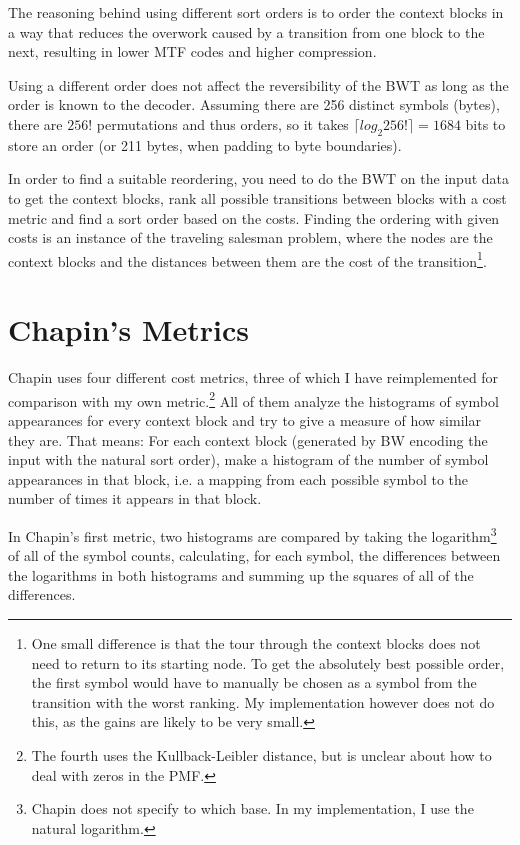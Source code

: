 \documentclass[a4paper]{scrreprt}
\begin{document}
The reasoning behind using different sort orders is to order the context blocks
in a way that reduces the overwork caused by a transition from one block to the
next, resulting in lower MTF codes and higher compression.

Using a different order does not affect the reversibility of the BWT as long as
the order is known to the decoder. Assuming there are 256 distinct symbols
(bytes), there are \(256!\) permutations and thus orders, so it takes \(\lceil
log_{2}256! \rceil = 1684\) bits to store an order (or 211 bytes, when
padding to byte boundaries).

In order to find a suitable reordering, you need to do the BWT on the input data
to get the context blocks, rank all possible transitions between blocks with a
cost metric and find a sort order based on the costs. Finding the ordering with
given costs is an instance of the traveling salesman problem, where the nodes
are the context blocks and the distances between them are the cost of the
transition\footnote{One small difference is that the tour through the context
blocks does not need to return to its starting node. To get the absolutely
best possible order, the first symbol would have to manually be chosen as a
symbol from the transition with the worst ranking. My implementation however
does not do this, as the gains are likely to be very small.}.

\section{Chapin's Metrics}

Chapin uses four different cost metrics, three of which I have reimplemented for
comparison with my own metric.\footnote{The fourth uses the Kullback-Leibler
distance, but is unclear about how to deal with zeros in the PMF.} All of them
analyze the histograms of symbol appearances for every context block and try to
give a measure of how similar they are. That means: For each context block
(generated by BW encoding the input with the natural sort order), make a
histogram of the number of symbol appearances in that block, i.e. a mapping from
each possible symbol to the number of times it appears in that block.

In Chapin's first metric, two histograms are compared by taking the
logarithm\footnote{Chapin does not specify to which base. In my implementation,
I use the natural logarithm.} of all of the symbol counts, calculating, for each
symbol, the differences between the logarithms in both histograms and summing up
the squares of all of the differences.
\end{document}
